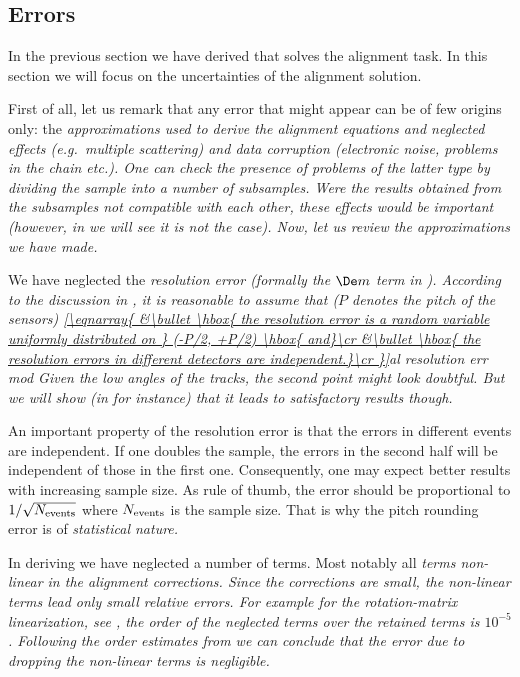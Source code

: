 \subsection[al err]{Errors}

In the previous section we have derived  that solves the alignment task. In this section we will focus on the uncertainties of the alignment solution.

First of all, let us remark that any error that might appear can be of few origins only: the \em{approximations} used to derive the alignment equations and \em{neglected effects} (e.g.~multiple scattering) and \em{data corruption} (electronic noise, problems in the  chain etc.). One can check the presence of problems of the latter type by dividing the sample into a number of subsamples. Were the results obtained from the subsamples not compatible with each other, these effects would be important (however, in  we will see it is not the case). Now, let us review the approximations we have made.

\> We have neglected the \em{resolution error} (formally the $\De m$ term in ). According to the discussion in , it is reasonable to assume that ($P$ denotes the pitch of the sensors)
\eqref{\eqnarray{
	&\bullet \hbox{ the resolution error is a random variable uniformly distributed on } (-P/2, +P/2) \hbox{ and}\cr
	&\bullet \hbox{ the resolution errors in different detectors are independent.}\cr
}}{al resolution err mod}
Given the low angles of the  tracks, the second point might look doubtful. But we will show (in  for instance) that it leads to satisfactory results though.

\par\parindent\itindent\indent\hang
An important property of the resolution error is that the errors in different events are independent. If one doubles the sample, the errors in the second half will be independent of those in the first one. Consequently, one may expect better results with increasing sample size. As rule of thumb, the error should be proportional to $1/\sqrt{N_{\rm events}}$ where $N_{\rm events}$ is the sample size. That is why the pitch rounding error is of \em{statistical nature}.

\> In deriving  we have neglected a number of terms. Most notably all \em{terms non-linear in the alignment corrections}. Since the corrections are small, the non-linear terms lead only small relative errors. For example for the rotation-matrix linearization, see , the order of the neglected terms over the retained terms is $10^{-5}$. Following the order estimates from  we can conclude that the error due to dropping the non-linear terms is negligible.

